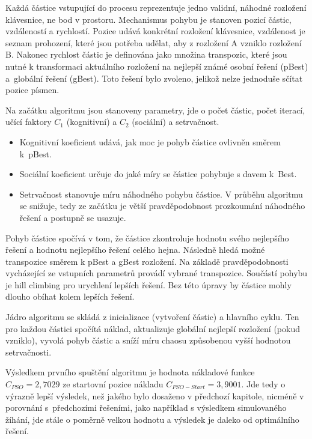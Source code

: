 \documentclass[a4paper, twoside, 12pt, czech]{article}
\begin{document}
Každá částice vstupující do procesu reprezentuje jedno validní, náhodné rozlo\-žení klávesnice, 
ne bod v prostoru. Mechanismus pohybu je stanoven pozicí částic, vzdáleností a rychlostí.
Pozice udává konkrétní rozložení klávesnice, vzdálenost je seznam prohození, které 
jsou potřeba udělat, aby z rozložení A vzniklo rozložení B. Nakonec rychlost částic
je definována jako množina transpozic, které jsou nutné k transformaci aktuálního rozložení na nejlepší 
známé osobní řešení (pBest) a~globální řešení (gBest). 
Toto řešení bylo zvoleno, 
jelikož nelze jednoduše sčítat pozice písmen.

Na začátku algoritmu jsou stanoveny parametry, jde o počet částic, počet iterací,
učící faktory $C_1$ (kognitivní) a $C_2$ (sociální) a setrvačnost.
\begin{itemize}
    \item Kognitivní koeficient udává, jak moc je pohyb částice ovlivněn směrem k~pBest.
    \item Sociální koeficient určuje do jaké míry se částice pohybuje s davem k~Best.
    \item Setrvačnost stanovuje míru náhodného pohybu částice. V průběhu algoritmu se snižuje,
    tedy ze začátku je větší pravděpodobnost prozkoumání náhodného řešení a postupně se usazuje.
\end{itemize}

Pohyb částice spočívá v tom, že částice zkontroluje hodnotu svého 
nejlepšího řešení a hodnotu nejlepšího řešení celého hejna. Následně hledá možné 
transpozice směrem k pBest a gBest rozložení. Na základě pravděpodobnosti vycházející 
ze vstupních parametrů provádí vybrané transpozice. Součástí pohybu je hill climbing
pro urychlení lepších řešení. Bez této úpravy by částice mohly dlouho obíhat kolem 
lepších řešení.

Jádro algoritmu se skládá z inicializace (vytvoření částic) a hlavního cyklu. Ten 
pro každou částici spočítá náklad, aktualizuje globální nejlepší rozložení (pokud vzniklo),
vyvolá pohyb částic a sníží míru chaosu způsobenou vyšší hodnotou setrvačnosti.

Výsledkem prvního spuštění algoritmu je hodnota nákladové funkce $C_{PSO}=2,7029$ ze 
startovní pozice nákladu $C_{PSO-Start}=3,9001$.
Jde tedy o výrazně lepší výsledek, než jakého bylo dosaženo v předchozí kapitole, 
nicméně v porovnání s~předchozími řešeními, jako například s výsledkem simulovaného 
žíhání, jde stále o poměrně velkou hodnotu a výsledek je daleko od optimálního 
řešení.
\end{document}
